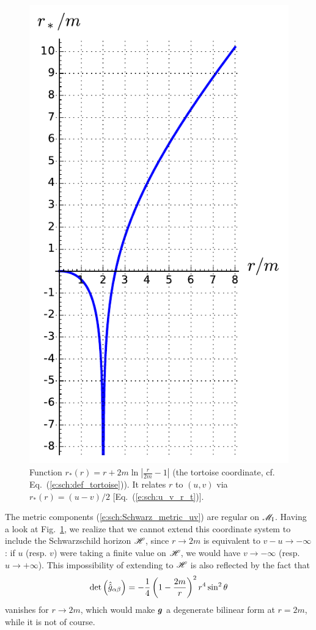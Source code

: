 \begin{figure}
\centerline{\includegraphics[height=0.4\textheight]{sch_tortoise.pdf}}
\caption[]{\label{f:sch:tortoise} \footnotesize
Function $r_*(r) = r + 2 m \ln \left| \frac{r}{2m} - 1 \right|$
(the tortoise coordinate, cf. Eq.~(\ref{e:sch:def_tortoise})).
It relates $r$ to $(u,v)$ via $r_*(r) = (u-v)/2$ [Eq.~(\ref{e:sch:u_v_r_t})].}
\end{figure}

The metric components (\ref{e:sch:Schwarz_metric_uv}) are regular on $\mathscr{M}_{\rm I}$.
Having a look at Fig.~\ref{f:sch:tortoise}, we realize that we cannot extend
this coordinate system to include the Schwarzschild horizon $\mathscr{H}$, since
$r\rightarrow 2m$ is equivalent to $v-u\rightarrow -\infty$: if $u$ (resp. $v$)
were taking a finite value on $\mathscr{H}$, we would have $v\rightarrow -\infty$
(resp. $u\rightarrow +\infty$). This impossibility of extending to $\mathscr{H}$
is also reflected by the fact that
\[
    \det \left( \hat{\hat{g}}_{\alpha\beta} \right) =
        - \frac{1}{4} \left( 1 - \frac{2 m}{r} \right) ^2 r^4 \sin^2\theta
\]
vanishes for $r\rightarrow 2m$, which would make $\bm{g}$ a degenerate bilinear
form at $r=2m$, while it is not of course.

